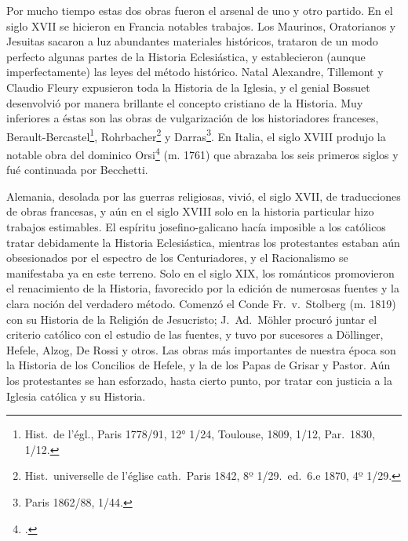 \raggedbottom{} \documentclass[12pt, a4paper, openany]{book} %
\begin{document}
\begin{enumerate}
        Por mucho tiempo estas dos obras fueron el arsenal de uno y otro partido. En el siglo XVII se hicieron en Francia notables trabajos. Los Maurinos, Oratorianos y Jesuitas sacaron a luz abundantes materiales históricos, trataron de un modo perfecto algunas partes de la Historia Eclesiástica, y establecieron (aunque imperfectamente) las leyes del método histórico. Natal Alexandre, Tillemont y Claudio Fleury expusieron toda la Historia de la Iglesia, y el genial Bossuet desenvolvió por manera brillante el concepto cristiano de la Historia. Muy inferiores a éstas son las obras de vulgarización de los historiadores franceses, Berault-Bercastel\footnote{Hist.\ de l'égl., Paris 1778/91, 12° 1/24, Toulouse, 1809, 1/12, Par.\ 1830, 1/12.}, Rohrbacher\footnote{Hist.\ universelle de l'église cath.\ Paris 1842, 8º 1/29.\ ed.\ 6.e 1870, 4º 1/29.} y Darras\footnote{Paris 1862/88, 1/44.}. En Italia, el siglo XVIII produjo la notable obra del dominico Orsi\footcite{OrsiBecchetti1752Storia} (m. 1761) que abrazaba los seis primeros siglos y fué continuada por Becchetti.

        Alemania, desolada por las guerras religiosas, vivió, el siglo XVII, de traducciones de obras francesas, y aún en el siglo XVIII solo en la historia particular hizo trabajos estimables. El espíritu josefino-galicano hacía imposible a los católicos tratar debidamente la Historia Eclesiástica, mientras los protestantes estaban aún obsesionados por el espectro de los Centuriadores, y el Racionalismo se manifestaba ya en este terreno. Solo en el siglo XIX, los románticos promovieron el renacimiento de la Historia, favorecido por la edición de numerosas fuentes y la clara noción del verdadero método. Comenzó el Conde Fr.\ v.\ Stolberg (m. 1819) con su Historia de la Religión de Jesucristo; J.\ Ad.\ Möhler procuró juntar el criterio católico con el estudio de las fuentes, y tuvo por sucesores a Döllinger, Hefele, Alzog, De Rossi y otros. Las obras más importantes de nuestra época son la Historia de los Concilios de Hefele, y la de los Papas de Grisar y Pastor. Aún los protestantes se han esforzado, hasta cierto punto, por tratar con justicia a la Iglesia católica y su Historia.
\end{enumerate}
\end{document}
